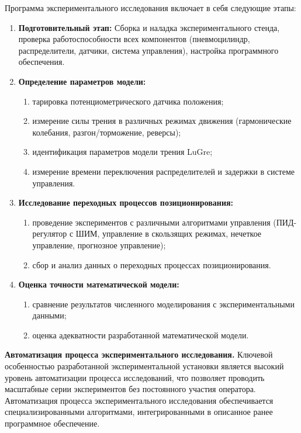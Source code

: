 Программа экспериментального исследования включает в себя следующие этапы:
\begin{enumerate}
	\item \textbf{Подготовительный этап:} Сборка и наладка экспериментального стенда, проверка работоспособности
	      всех компонентов (пневмоцилиндр, распределители, датчики, система управления), настройка программного обеспечения.
	\item \textbf{Определение параметров модели:}
	      \begin{enumerate}
		      \item тарировка потенциометрического датчика положения;
		      \item измерение силы трения в различных режимах движения (гармонические колебания, разгон/торможение, реверсы);
		      \item идентификация параметров модели трения LuGre;
		      \item измерение времени переключения распределителей и задержки в системе управления.
	      \end{enumerate}
	\item \textbf{Исследование переходных процессов позиционирования:}
	      \begin{enumerate}
		      \item проведение экспериментов с различными алгоритмами управления (ПИД-регулятор с ШИМ,
		            управление в скользящих режимах, нечеткое управление, прогнозное управление);
		      \item сбор и анализ данных о переходных процессах позиционирования.
	      \end{enumerate}
	\item \textbf{Оценка точности математической модели:}
	      \begin{enumerate}
		      \item сравнение результатов численного моделирования с экспериментальными данными;
		      \item оценка адекватности разработанной математической модели.
	      \end{enumerate}
\end{enumerate}

\textbf{Автоматизация процесса экспериментального исследования.}
Ключевой особенностью разработанной экспериментальной установки является высокий уровень автоматизации процесса
исследований, что позволяет проводить масштабные серии экспериментов без постоянного участия оператора.
Автоматизация процесса экспериментального исследования обеспечивается специализированными
алгоритмами, интегрированными в описанное ранее программное обеспечение.


